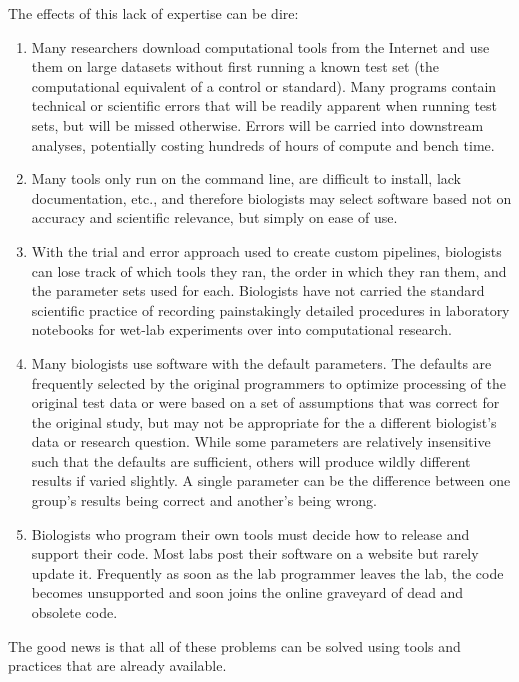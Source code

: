 \documentclass[ChapterTOCs,krantz2]{krantz} %
\begin{document}
The effects of this lack of expertise can be dire:  
\begin{enumerate}
\item Many researchers download computational tools from the Internet 
and use them on large datasets without first
running a known test set
(the computational equivalent of a control or standard).  Many programs contain
technical or scientific errors that will be readily apparent when running 
test sets, but will be missed otherwise\cite{}. Errors will be
carried into downstream analyses, potentially costing
hundreds of hours of compute and bench time.  

\item Many tools only run on the command line, are difficult to install, lack
documentation, etc., and therefore biologists may
select software based not on accuracy and scientific relevance, but simply on
ease of use.  

\item With the trial and error
approach used to create custom pipelines, biologists can
lose track of which tools they ran, the order in which they ran them, and the
parameter sets used for each.  Biologists have not carried 
the standard scientific practice of recording
painstakingly detailed procedures in laboratory notebooks for wet-lab
experiments over into computational research.

\item Many biologists use software with the default parameters.  
The defaults are frequently selected by the original
programmers to optimize processing of the original test data or were based on a
set of assumptions that was correct for the original study, but may not be appropriate
for the a different biologist's data or research question.  While some parameters 
are relatively insensitive such that the defaults are sufficient, others 
will produce wildly different results if varied slightly.  
A single parameter
can be the difference between one group's results being correct and another's
being wrong.  

\item Biologists who program their own tools must decide how
to release and support their code.
Most labs post their software on a website but rarely update it.  
Frequently as soon as the lab programmer
leaves the lab, the code becomes unsupported and soon
joins the online graveyard of dead and obsolete code.  
\end{enumerate}

The good news is that
all of these problems can be solved using tools 
and practices that are already available.  
\end{document}
